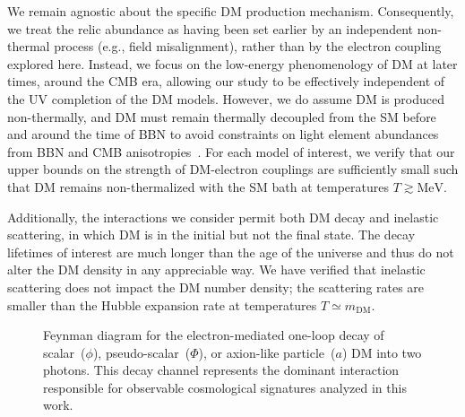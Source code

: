 We remain agnostic about the specific DM production mechanism. Consequently, we treat the relic abundance as having been set earlier by an independent non-thermal process (e.g., field misalignment), rather than by the electron coupling explored here.
Instead, we focus on the low-energy phenomenology of DM at later times, around the CMB era, allowing our study to be effectively independent of the UV completion of the DM models. However, we do assume DM is produced non-thermally, and DM must remain thermally decoupled from the SM before and around the time of BBN to avoid constraints on light element abundances from BBN and CMB anisotropies~\cite{Boehm:2002yz,Serpico:2004nm,Nollett:2013pwa,Steigman:2014pfa,Nollett:2014lwa,Escudero:2018mvt,Sabti:2019mhn,Giovanetti:2021izc,An:2022sva,An:2024nsw}.
For each model of interest, we verify that our upper bounds on the strength of DM-electron couplings are sufficiently small such that DM remains non-thermalized with the SM bath at temperatures $T \gtrsim \mathrm{MeV}$.

Additionally, the interactions we consider permit both DM decay and inelastic scattering, in which DM is in the initial but not the final state.
The decay lifetimes of interest are much longer than the age of the universe and thus do not alter the DM density in any appreciable way.
We have verified that inelastic scattering does not impact the DM number density; the scattering rates are smaller than the Hubble expansion rate at temperatures $T \simeq m_\mathrm{DM}$.

\begin{figure}[ht!]
  \centering
  \caption[Feynman diagram for the one-loop decay of spin-zero DM into two photons]{Feynman diagram for the electron-mediated one-loop decay of scalar~($\phi$), pseudo-scalar~($\Phi$), or axion-like particle~($a$) DM into two photons.  This decay channel represents the dominant interaction responsible for observable cosmological signatures analyzed in this work.
  }
  \label{fig:ch9-loop_diagram}
\end{figure}


